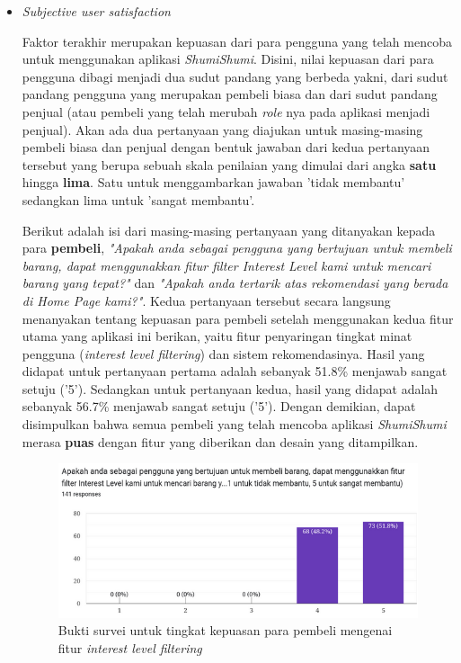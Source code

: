 \documentclass[a4paper]{article}
\begin{document}
\begin{enumerate}
\begin{itemize}
        \item \textit{Subjective user satisfaction}
        
        Faktor terakhir merupakan kepuasan dari para pengguna yang telah mencoba untuk menggunakan aplikasi \textit{ShumiShumi}. Disini, nilai kepuasan dari para pengguna dibagi menjadi dua sudut pandang yang berbeda yakni, dari sudut pandang pengguna yang merupakan pembeli biasa dan dari sudut pandang penjual (atau pembeli yang telah merubah \textit{role} nya pada aplikasi menjadi penjual). Akan ada dua pertanyaan yang diajukan untuk masing-masing pembeli biasa dan penjual dengan bentuk jawaban dari kedua pertanyaan tersebut yang berupa sebuah skala penilaian yang dimulai dari angka \textbf{satu} hingga \textbf{lima}. Satu untuk menggambarkan jawaban 'tidak membantu' sedangkan lima untuk 'sangat membantu'.

        Berikut adalah isi dari masing-masing pertanyaan yang ditanyakan kepada para \textbf{pembeli}, \textit{"Apakah anda sebagai pengguna yang bertujuan untuk membeli barang, dapat menggunakkan fitur filter Interest Level kami untuk mencari barang yang tepat?"} dan \textit{"Apakah anda tertarik atas rekomendasi yang berada di Home Page kami?"}. Kedua pertanyaan tersebut secara langsung menanyakan tentang kepuasan para pembeli setelah menggunakan kedua fitur utama yang aplikasi ini berikan, yaitu fitur penyaringan tingkat minat pengguna (\textit{interest level filtering}) dan sistem rekomendasinya. Hasil yang didapat untuk pertanyaan pertama adalah sebanyak 51.8\% menjawab sangat setuju ('5'). Sedangkan untuk pertanyaan kedua, hasil yang didapat adalah sebanyak 56.7\% menjawab sangat setuju ('5'). Dengan demikian, dapat disimpulkan bahwa semua pembeli yang telah mencoba aplikasi \textit{ShumiShumi} merasa \textbf{puas} dengan fitur yang diberikan dan desain yang ditampilkan. 

        \begin{figure}[h]
            \centering
            \includegraphics[scale=0.50]{images/evaluasi ui user 2/Survei 2 - Pertanyaan 1.png}
            \caption{Bukti survei untuk tingkat kepuasan para pembeli mengenai fitur \textit{interest level filtering}}
            \label{fig:userInterestLevel}
        \end{figure}
        

\end{itemize}
\end{enumerate}
\end{document}
